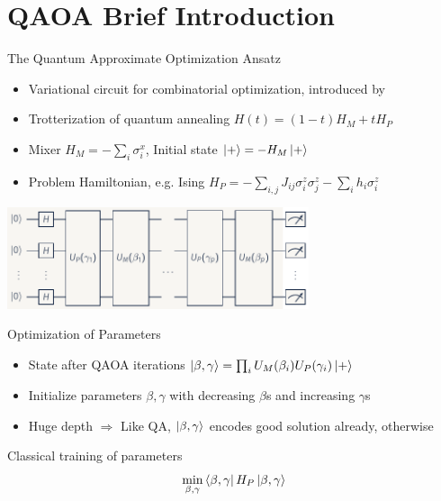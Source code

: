 \documentclass[aspectratio=169]{beamer}
\begin{document}
\section{QAOA Brief Introduction}



\begin{frame}{The Quantum Approximate Optimization Ansatz}
\begin{center}
    \begin{itemize}
        \item Variational circuit for combinatorial optimization, introduced
            by~\citeauthor{farhi2014}~\cite{farhi2014}
        \item Trotterization of quantum annealing $H(t) = (1-t) H_M +
            t H_P$
        \item Mixer $H_M = -\sum_{i} \sigma^x_i$, Initial state $\ket{+} = -H_M \ket{+}$
        \item Problem Hamiltonian, e.g. Ising $H_P = -\sum_{i,j} J_{ij} \sigma^z_i
            \sigma_j^z - \sum_i h_i \sigma_i^z$
    \end{itemize}
    \vspace{6pt}
    \includegraphics[height=3.0cm]{graphics/build/qaoa.pdf}
\end{center}
\end{frame}

\begin{frame}{Optimization of Parameters}
    \begin{itemize}
        \item State after QAOA iterations $\ket{\beta, \gamma} = \prod_i U_M(\beta_i)
            U_P(\gamma_i) \ket{+}$
        \item Initialize parameters $\beta, \gamma$ with decreasing $\beta$s and
            increasing $\gamma$s
        \item Huge depth $\Rightarrow$ Like QA, $\ket{\beta, \gamma}$ encodes
            good solution already, otherwise
    \end{itemize}
    \begin{block}{Classical training of parameters}
        \[
            \min_{\beta, \gamma} \bra{\beta, \gamma} H_P \ket{\beta, \gamma}
        \]
    \end{block}
\end{frame}
\end{document}
